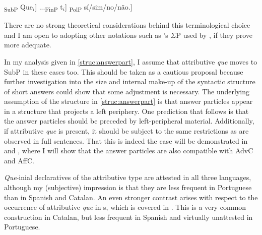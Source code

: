 \ea\label{struc:answerpart} {\ob}\textsubscript{SubP} Que$_i$] ...{\ob}\textsubscript{FinP} t$_i$] {\ob}\textsubscript{PolP} sí/sim/no/não.]
\z

\begin{sloppypar}
There are no strong theoretical considerations behind this terminological choice and I am open to adopting other notations such as \citeauthor{Laka1990}'s $\Sigma$P used by \citet{Martins2013}, if they prove more adequate. 
\end{sloppypar}

In my analysis given in \eqref{struc:answerpart}, I assume that  attributive \emph{que} moves to SubP in these cases too. This  should be taken as a cautious proposal because further investigation into the size and internal make-up of the syntactic structure of  short answers could show that some adjustment is necessary. The underlying assumption of the structure in \eqref{struc:answerpart} is  that answer particles appear in a structure that projects a left periphery. One prediction that follows is that   the answer particles should be preceded by left-peripheral material. Additionally, if attributive \emph{que} is present,  it should be subject to the same restrictions as are observed in full sentences. That this is indeed the case will be demonstrated in  and , where I will show that the answer particles are also compatible with AdvC and AffC.

\emph{Que}-inial declaratives of the attributive type are attested in all three  languages, although my (subjective) impression is that they are less frequent in Portuguese than in Spanish and Catalan. An even stronger contrast arises  with respect to the occurrence of attributive \emph{que} in s, which is covered in  . This is a very common construction in  Catalan, but less frequent in Spanish and virtually unattested in Portuguese.

